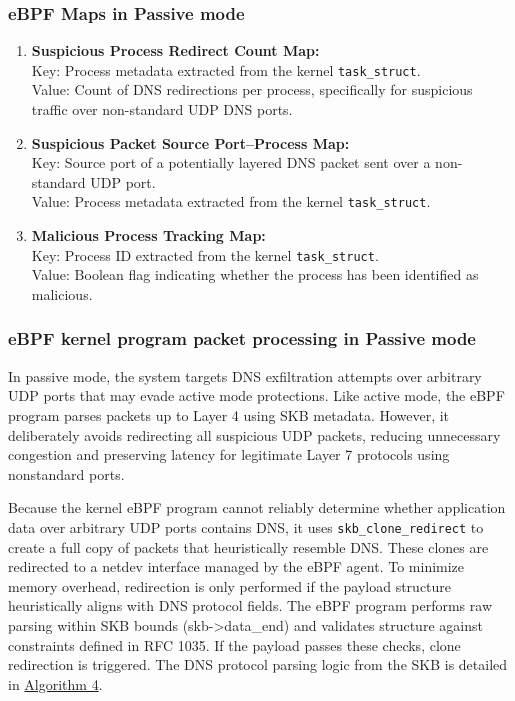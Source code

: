 \documentclass [11pt, proquest] {uwthesis}[2020/02/24]
\begin{document}
\subsubsection{\textbf{eBPF Maps in Passive mode}}
\begin{enumerate}[itemsep=1pt,parsep=0pt]

\item \textbf{Suspicious Process Redirect Count Map:} \\
Key: Process metadata extracted from the kernel \texttt{task\_struct}. \\
Value: Count of DNS redirections per process, specifically for suspicious traffic over non-standard UDP DNS ports.

\item \textbf{Suspicious Packet Source Port–Process Map:} \\
Key: Source port of a potentially layered DNS packet sent over a non-standard UDP port. \\
Value: Process metadata extracted from the kernel \texttt{task\_struct}.

\item \textbf{Malicious Process Tracking Map:} \\
Key: Process ID extracted from the kernel \texttt{task\_struct}. \\
Value: Boolean flag indicating whether the process has been identified as malicious.
\end{enumerate}

\subsubsection{\textbf{eBPF kernel program packet processing in Passive mode}}
\label{passive:sec1}
In passive mode, the system targets DNS exfiltration attempts over arbitrary UDP ports that may evade active mode protections. Like active mode, the eBPF program parses packets up to Layer 4 using SKB metadata. However, it deliberately avoids redirecting all suspicious UDP packets, reducing unnecessary congestion and preserving latency for legitimate Layer 7 protocols using nonstandard ports.

Because the kernel eBPF program cannot reliably determine whether application data over arbitrary UDP ports contains DNS, it uses \texttt{skb\_clone\_redirect} to create a full copy of packets that heuristically resemble DNS. These clones are redirected to a netdev interface managed by the eBPF agent. To minimize memory overhead, redirection is only performed if the payload structure heuristically aligns with DNS protocol fields. The eBPF program performs raw parsing within SKB bounds (skb->data\_end) and validates structure against constraints defined in RFC 1035. If the payload passes these checks, clone redirection is triggered. The DNS protocol parsing logic from the SKB is detailed in \hyperref[sec:alg4]{Algorithm 4}.
\end{document}
